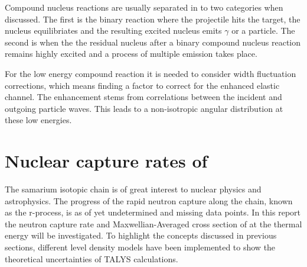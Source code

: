 \documentclass[a4paper,english]{article}
\begin{document}
Compound nucleus reactions are usually separated in to two categories when discussed. The first is the binary reaction where the projectile hits the target, the nucleus equilibriates and the resulting excited nucleus emits $\gamma$ or a particle. The second is when the the residual nucleus after a binary compound nucleus reaction remains highly excited and a process of multiple emission takes place.

For the low energy compound reaction it is needed to consider width fluctuation corrections, which means finding a factor to correct for the enhanced elastic channel. The enhancement stems from correlations between the incident and outgoing particle waves. This leads to a non-isotropic angular distribution at these low energies.

\section{Nuclear capture rates of }
The samarium isotopic chain is of great interest to nuclear physics and astrophysics. The progress of the rapid neutron capture along the chain, known as the r-process, is as of yet undetermined and missing data points. In this report the neutron capture rate and Maxwellian-Averaged cross section of  at the thermal energy will be investigated. To highlight the concepts discussed in previous sections, different level density models have been implemented to show the theoretical uncertainties of TALYS calculations.
\end{document}
